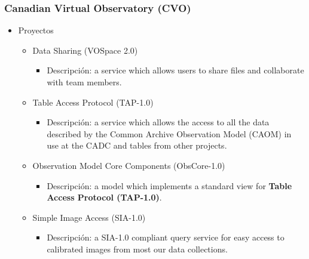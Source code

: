 \subsubsection{Canadian Virtual Observatory (CVO)}
	\begin{itemize}
		\item Proyectos
		\begin{itemize}
			\item Data Sharing (VOSpace 2.0)
			\begin{itemize}
				\item Descripción: a service which allows users to share files and collaborate with team members.  
			\end{itemize}
			\item Table Access Protocol (TAP-1.0)
			\begin{itemize}
				\item Descripción: a service which allows the access to all the data described by the Common Archive Observation Model (CAOM) in use at the CADC and tables from other projects.
			\end{itemize}
			\item Observation Model Core Components (ObsCore-1.0)
			\begin{itemize}
				\item Descripción: a model which implements a standard view for \textbf{Table Access Protocol (TAP-1.0)}.
			\end{itemize}
			\item Simple Image Access (SIA-1.0)
			\begin{itemize}
				\item Descripción: a SIA-1.0 compliant query service for easy access to calibrated images from most our data collections.
			\end{itemize}
		\end{itemize}
	\end{itemize}

